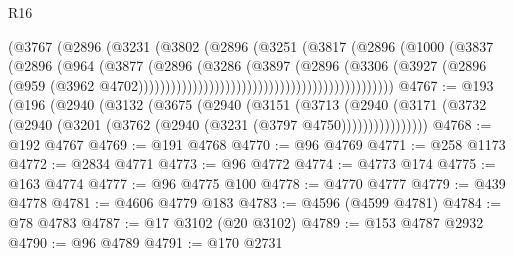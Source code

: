 \begin{lexlean}{R16}
\begin{coremodule}
                                                      (@3767
                                                        (@2896
                                                          (@3231
                                                            (@3802
                                                              (@2896
                                                                (@3251
                                                                  (@3817
                                                                    (@2896
                                                                      (@1000
                                                                        (@3837
                                                                          (@2896
                                                                            (@964
                                                                              (@3877
                                                                                (@2896
                                                                                  (@3286
                                                                                    (@3897
                                                                                      (@2896
                                                                                        (@3306
                                                                                          (@3927
                                                                                            (@2896
                                                                                              (@959
                                                                                                (@3962
                                                                                                  @4702)))))))))))))))))))))))))))))))))))))))))))))))
@4767 := @193
    (@196
      (@2940
        (@3132
          (@3675
            (@2940
              (@3151
                (@3713
                  (@2940
                    (@3171 (@3732 (@2940 (@3201 (@3762 (@2940 (@3231 (@3797 @4750))))))))))))))))
@4768 := @192 @4767
@4769 := @191 @4768
@4770 := @96 @4769
@4771 := @258 @1173
@4772 := @2834 @4771
@4773 := @96 @4772
@4774 := @4773 @174
@4775 := @163 @4774
@4777 := @96 @4775 @100
@4778 := @4770 @4777
@4779 := @439 @4778
@4781 := @4606 @4779 @183
@4783 := @4596 (@4599 @4781)
@4784 := @78 @4783
@4787 := @17 @3102 (@20 @3102)
@4789 := @153 @4787 @2932
@4790 := @96 @4789
@4791 := @170 @2731

\end{coremodule}
\end{lexlean}
